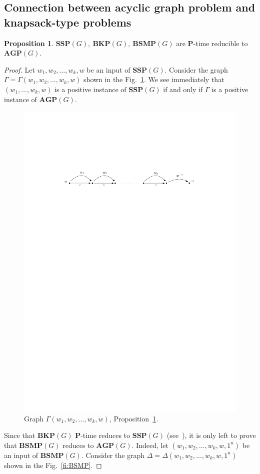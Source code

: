 \documentclass[10pt]{amsart}
\theoremstyle{definition}
\newtheorem{proposition}[theorem]{Proposition}
\def\P{{\mathbf{P}}}
\def\SSP{{\mathbf{SSP}}}
\def\BSMP{{\mathbf{BSMP}}}
\def\BKP{{\mathbf{BKP}}}
\def\AGP{{\mathbf{AGP}}}
\begin{document}
\subsection{Connection between acyclic graph problem and knapsack-type problems}
\begin{proposition}\label{pr:reduction_to_agp}
$\SSP(G),\ \BKP(G),\ \BSMP(G)$ are $\P$-time reducible to $\AGP(G)$.
\end{proposition}
\begin{proof} Let $w_1,w_2,\ldots, w_k, w$ be an input of $\SSP(G)$. Consider the graph $\Gamma=\Gamma(w_1,w_2,\ldots,w_k,w)$ shown in the Fig.~\ref{fi:SSP}. We see immediately that $(w_1,\ldots,w_k,w)$ is a positive instance of $\SSP(G)$ if and only if $\Gamma$ is a positive instance of $\AGP(G)$.
\begin{figure}[h]
 \centering
 \includegraphics[width=4.5in]{ssp}
 \caption{Graph $\Gamma(w_1,w_2,\ldots,w_k,w)$, Proposition~\ref{pr:reduction_to_agp}.}\label{fi:SSP}
\end{figure}
Since that $\BKP(G)$ $\P$-time reduces to $\SSP(G)$ (see~\cite{Miasnikov-Nikolaev-Ushakov:2014a}), it is only left to prove that $\BSMP(G)$ reduces to $\AGP(G)$. Indeed, let $(w_1,w_2,\ldots,w_k,w,1^n)$ be an input of $\BSMP(G)$. Consider the graph $\Delta=\Delta(w_1,w_2,\ldots,w_k,w,1^n)$ shown in the Fig.~\ref{fi:BSMP}.

\end{proof}
\end{document}
